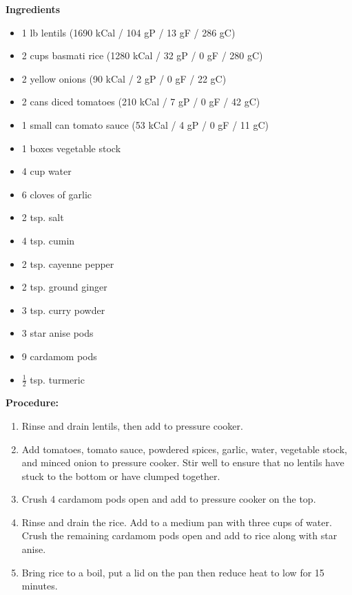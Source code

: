 \begin{multicols}{2}
\textbf{Ingredients}
\begin{itemize}
\item 1 lb lentils \newline (1690 kCal / 104 gP / 13 gF / 286 gC)
\item 2 cups basmati rice \newline (1280 kCal / 32 gP / 0 gF / 280 gC)
\item 2 yellow onions \quad (90 kCal / 2 gP / 0 gF / 22 gC)
\item 2 cans diced tomatoes \newline (210 kCal / 7 gP / 0 gF / 42 gC)
\item 1 small can tomato sauce \newline (53 kCal / 4 gP / 0 gF / 11 gC)
\item 1 boxes vegetable stock
\item 4 cup water 
\item 6 cloves of garlic
\item 2 tsp. salt
\item 4 tsp. cumin
\item 2 tsp. cayenne pepper
\item 2 tsp. ground ginger
\item 3 tsp. curry powder
\item 3 star anise pods
\item 9 cardamom pods
\item $\frac{1}{2}$ tsp. turmeric 


\end{itemize}


\columnbreak
\textbf{Procedure:}
\medskip


\begin{enumerate}

\item Rinse and drain lentils, then add to pressure cooker. 
\item Add tomatoes, tomato sauce, powdered spices, garlic, water, vegetable stock, and minced onion to pressure cooker. Stir well to ensure that no lentils have stuck to the bottom or have clumped together. 
\item Crush 4 cardamom pods open and add to pressure cooker on the top. 

\item Rinse and drain the rice. Add to a medium pan with three cups of water. Crush the remaining cardamom pods open and add to rice along with star anise. 
\item Bring rice to a boil, put a lid on the pan then reduce heat to low for 15 minutes. 


\end{enumerate}
\end{multicols}
